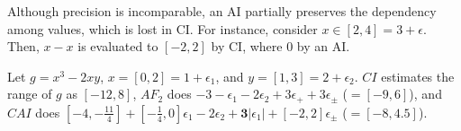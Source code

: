 \documentclass[runningheads,a4paper,oribibl]{llncs}
\begin{document}
Although precision is incomparable, 
an AI partially preserves the dependency among values, which is lost in CI. 
For instance, consider $x \in [2,4] = 3+\epsilon$.
Then, $x - x$ is evaluated to $[-2,2]$ by CI, where $0$ by an AI. 

\begin{example} \label{examp:sensitivity}
  Let $g = x^3 - 2xy$, $x = [0,2] = 1 + \epsilon_1$, and $y=[1,3] = 2+\epsilon_2$.
  $CI$ estimates the range of $g$ as $[-12,8]$, 
  $AF_2$ does 
  $-3 - \epsilon_1 - 2\epsilon_2 + 3\epsilon_+ + 3\epsilon_{\pm}$ ($= [-9,6]$), 
  and $CAI$ does 
  $[-4,-\frac{11}{4}] + [-\frac{1}{4}, 0]\epsilon_1 - 2\epsilon_2 +
  \textbf{3}|\epsilon_1| + [-2,2]\epsilon_{\pm}$ ($= [-8,4.5]$).
\end{example}
\end{document}
